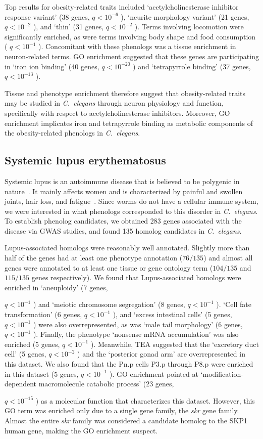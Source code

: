 \documentclass[10pt,letterpaper,twocolumn]{article}
\newcommand{\cel}{\emph{C.~elegans}}
\newcommand{\hlupus}{283}
\newcommand{\wlupus}{135}
\newcommand{\qval}[1]{
                      \ensuremath{
                                  q<10^{-#1}
                                  }
                      }
\begin{document}
Top results for obesity-related traits included `acetylcholinesterase inhibitor
response variant' (38 genes, \qval{6}),
`neurite morphology variant' (21 genes, \qval{2}),
and `thin' (31 genes, \qval{2}).
Terms involving locomotion were significantly enriched, as were terms involving
body shape and food consumption (\qval{1}). Concomitant with these phenologs was
a tissue enrichment in neuron-related terms. GO enrichment suggested that these
genes are participating in `iron ion binding' (40 genes, \qval{20}) and
`tetrapyrrole binding' (37 genes, \qval{13}).

Tissue and phenotype enrichment therefore suggest that obesity-related traits
may be studied in \cel{} through neuron physiology and function, specifically
with respect to acetylcholinesterase inhibitors. Moreover, GO enrichment
implicates iron and tetrapyrrole binding as metabolic components of
the obesity-related phenologs in \cel{}.

\subsection*{Systemic lupus erythematosus}
Systemic lupus is an autoimmune disease that is believed to be polygenic in
nature~\cite{}. It mainly affects women and is characterized by painful
and swollen joints, hair loss, and fatigue~\cite{}. Since worms do not have a
cellular immune system, we were interested in what phenologs corresponded to
this disorder in \cel{}. To establish phenolog candidates, we obtained
\hlupus{} genes associated with the disease via GWAS studies, and found
\wlupus{} homolog candidates in \cel{}.

Lupus-associated homologs were reasonably well annotated. Slightly more than half
of the genes had at least one phenotype annotation ($76/\wlupus{}$) and almost
all genes were annotated to at least one tissue or gene ontology term
($104/\wlupus{}$ and $115/\wlupus$ genes respectively).
We found that Lupus-associated homologs were enriched in `aneuploidy' (7 genes,
\qval{1}) and `meiotic chromosome segregation' (8 genes, \qval{1}). `Cell fate
transformation' (6 genes, \qval{1}), and `excess intestinal cells'
(5 genes, \qval{1}) were also overrepresented, as was `male tail morphology'
(6 genes, \qval{1}). Finally, the phenotype `nonsense mRNA accumulation' was also
enriched (5 genes, \qval{1}).
Meanwhile, TEA suggested that the
`excretory duct cell' (5 genes, \qval{2}) and the `posterior gonad arm' are
overrepresented in this dataset. We also found that the Pn.p cells P3.p through
P8.p were enriched in this dataset (5 genes, \qval{1}). GO enrichment pointed
at `modification-dependent macromolecule catabolic process' (23 genes,
\qval{15}) as a molecular function that characterizes this dataset. However,
this GO term was enriched only due to a single gene family, the \emph{skr} gene
family. Almost the entire \emph{skr} family was considered a candidate homolog
to the SKP1 human gene, making the GO enrichment suspect.
\end{document}
